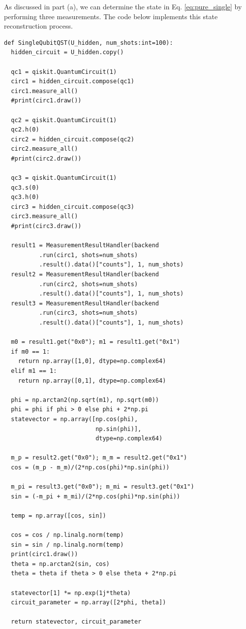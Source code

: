 \documentclass[a4paper, 11pt]{article}
\begin{document}
As discussed in part (a), we can determine the state in Eq. \ref{eq:pure_single} by performing three measurements. The code below implements this state reconstruction process.
\begin{verbatim}
def SingleQubitQST(U_hidden, num_shots:int=100):
  hidden_circuit = U_hidden.copy()
  
  qc1 = qiskit.QuantumCircuit(1)
  circ1 = hidden_circuit.compose(qc1)
  circ1.measure_all()
  #print(circ1.draw())
  
  qc2 = qiskit.QuantumCircuit(1)
  qc2.h(0)
  circ2 = hidden_circuit.compose(qc2)
  circ2.measure_all()
  #print(circ2.draw())
  
  qc3 = qiskit.QuantumCircuit(1)
  qc3.s(0)
  qc3.h(0)
  circ3 = hidden_circuit.compose(qc3)
  circ3.measure_all()
  #print(circ3.draw())
  
  result1 = MeasurementResultHandler(backend
          .run(circ1, shots=num_shots)
          .result().data()["counts"], 1, num_shots)
  result2 = MeasurementResultHandler(backend
          .run(circ2, shots=num_shots)
          .result().data()["counts"], 1, num_shots)
  result3 = MeasurementResultHandler(backend
          .run(circ3, shots=num_shots)
          .result().data()["counts"], 1, num_shots)

  m0 = result1.get("0x0"); m1 = result1.get("0x1")
  if m0 == 1:
    return np.array([1,0], dtype=np.complex64)
  elif m1 == 1:
    return np.array([0,1], dtype=np.complex64)

  phi = np.arctan2(np.sqrt(m1), np.sqrt(m0))
  phi = phi if phi > 0 else phi + 2*np.pi
  statevector = np.array([np.cos(phi),
                          np.sin(phi)], 
                          dtype=np.complex64)

  m_p = result2.get("0x0"); m_m = result2.get("0x1")
  cos = (m_p - m_m)/(2*np.cos(phi)*np.sin(phi))

  m_pi = result3.get("0x0"); m_mi = result3.get("0x1")
  sin = (-m_pi + m_mi)/(2*np.cos(phi)*np.sin(phi))

  temp = np.array([cos, sin])

  cos = cos / np.linalg.norm(temp)
  sin = sin / np.linalg.norm(temp)
  print(circ1.draw())
  theta = np.arctan2(sin, cos)
  theta = theta if theta > 0 else theta + 2*np.pi

  statevector[1] *= np.exp(1j*theta)
  circuit_parameter = np.array([2*phi, theta])

  return statevector, circuit_parameter
\end{verbatim}
\end{document}
